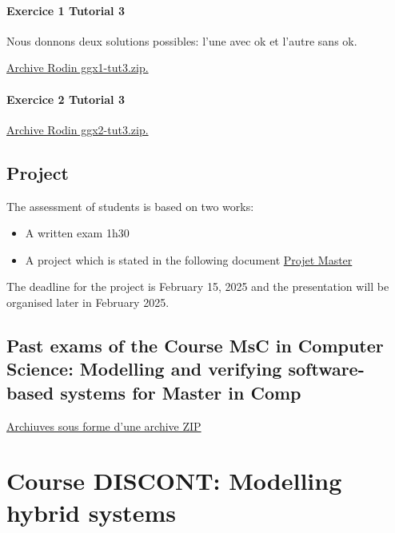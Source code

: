 \documentclass[ 12pt]{article}
\begin{document}
\paragraph{Exercice 1 Tutorial 3}

Nous donnons deux solutions possibles: l'une avec ok et l'autre sans ok.

\href{http://mery54.github.io/teaching/mosos/models/qqx1-tut3.zip}{Archive 
  Rodin   ggx1-tut3.zip.}




\paragraph{Exercice 2 Tutorial 3}

\href{http://mery54.github.io/teaching/mosos/models/ggx2-tut3.zip}{Archive 
  Rodin   ggx2-tut3.zip.}






  \subsection{Project}
\label{sec:project}

The assessment  of students is based on two works:
\begin{itemize}
\item A written  exam   1h30
\item A project which is stated in the following document
  \href{http://mery54.github.io/teaching/mosos/lecturesnotes/master-projets2425.pdf}{Projet
    Master } 
\end{itemize}

The deadline for the project is  February 15, 2025 and the presentation
will be  organised later in February 2025. 



\subsection{Past exams  of  the  Course MsC in Computer Science: Modelling and verifying software-based systems for Master in Comp}
\label{sec:past-exams-course}


\href{http://mery54.github.io/teaching/mosos/lecturesnotes/annales-master2425.zip}{Archiuves
sous forme d'une archive ZIP}


\hrulefill




\section{Course DISCONT: Modelling hybrid systems}
\label{sec:course-discont}
\end{document}
